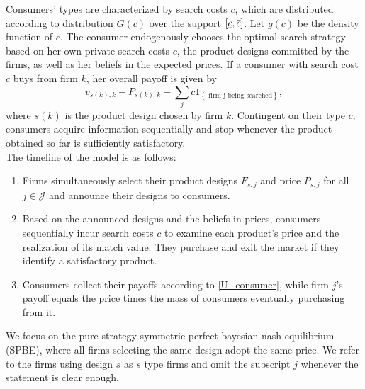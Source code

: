 \documentclass[14pt]{article}
\theoremstyle{plain}
\theoremstyle{definition}
\theoremstyle{remark}
\newcommand{\one}{1}
\newcommand{\indicator}[1]{\one_{\left\lbrace #1\right\rbrace}}
\DeclareRobustCommand\1{\futurelet\oneNext\oneCheck}
\begin{document}
Consumers' types are characterized by search costs $c$, which are distributed according to distribution $G(c)$ over the support $[\underline{c}, \Bar{c}]$. Let $g(c)$ be the density function of $c$. The consumer endogenously chooses the optimal search strategy based on her own private search costs $c$, the product designs committed by the firms, as well as her beliefs in the expected prices.  If a consumer with search cost $c$ buys from firm $k$, her overall payoff is given by 
\begin{equation}\label{U_consumer}
v_{s(k),k}-P_{s(k),k}-\sum_{j}c \indicator{\text{ firm j being searched}},
\end{equation}
where $s(k)$ is the product design chosen by firm $k$.
  Contingent on their type $c$, consumers acquire information sequentially and stop whenever the product obtained so far is sufficiently satisfactory.\\

The timeline of the model is as follows:
\begin{enumerate}
    \item Firms simultaneously select their product designs $F_{s,j}$ and price $P_{s,j}$ for all $j\in \mathcal{J}$ and announce their designs to consumers.
    \item Based on the announced designs and the beliefs in prices, consumers sequentially incur search costs $c$ to examine each product's price and the realization of its match value. They purchase and exit the market if they identify a satisfactory product.
    \item Consumers collect their payoffs according to \eqref{U_consumer}, while firm $j$'s payoff equals the price times the mass of consumers eventually purchasing from it.
\end{enumerate}


We focus on the pure-strategy symmetric perfect bayesian nash equilibrium (SPBE), where all firms selecting the same design adopt the same price.  We refer to the firms using design $s$ as $s$ type firms and omit the subscript $j$ whenever the statement is clear enough.
\end{document}
